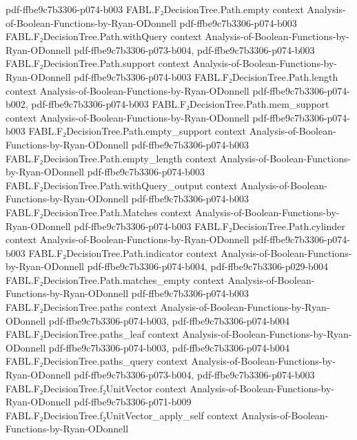 \begin{theorem}
  {pdf-ffbe9c7b3306-p074-b003}
\proofstep
  {FABL.F₂DecisionTree.Path.empty}
  {context}
  {Analysis-of-Boolean-Functions-by-Ryan-ODonnell}
  {pdf-ffbe9c7b3306-p074-b003}
\proofstep
  {FABL.F₂DecisionTree.Path.withQuery}
  {context}
  {Analysis-of-Boolean-Functions-by-Ryan-ODonnell}
  {pdf-ffbe9c7b3306-p073-b004,
    pdf-ffbe9c7b3306-p074-b003}
\proofstep
  {FABL.F₂DecisionTree.Path.support}
  {context}
  {Analysis-of-Boolean-Functions-by-Ryan-ODonnell}
  {pdf-ffbe9c7b3306-p074-b003}
\proofstep
  {FABL.F₂DecisionTree.Path.length}
  {context}
  {Analysis-of-Boolean-Functions-by-Ryan-ODonnell}
  {pdf-ffbe9c7b3306-p074-b002,
    pdf-ffbe9c7b3306-p074-b003}
\proofstep
  {FABL.F₂DecisionTree.Path.mem_support}
  {context}
  {Analysis-of-Boolean-Functions-by-Ryan-ODonnell}
  {pdf-ffbe9c7b3306-p074-b003}
\proofstep
  {FABL.F₂DecisionTree.Path.empty_support}
  {context}
  {Analysis-of-Boolean-Functions-by-Ryan-ODonnell}
  {pdf-ffbe9c7b3306-p074-b003}
\proofstep
  {FABL.F₂DecisionTree.Path.empty_length}
  {context}
  {Analysis-of-Boolean-Functions-by-Ryan-ODonnell}
  {pdf-ffbe9c7b3306-p074-b003}
\proofstep
  {FABL.F₂DecisionTree.Path.withQuery_output}
  {context}
  {Analysis-of-Boolean-Functions-by-Ryan-ODonnell}
  {pdf-ffbe9c7b3306-p074-b003}
\proofstep
  {FABL.F₂DecisionTree.Path.Matches}
  {context}
  {Analysis-of-Boolean-Functions-by-Ryan-ODonnell}
  {pdf-ffbe9c7b3306-p074-b003}
\proofstep
  {FABL.F₂DecisionTree.Path.cylinder}
  {context}
  {Analysis-of-Boolean-Functions-by-Ryan-ODonnell}
  {pdf-ffbe9c7b3306-p074-b003}
\proofstep
  {FABL.F₂DecisionTree.Path.indicator}
  {context}
  {Analysis-of-Boolean-Functions-by-Ryan-ODonnell}
  {pdf-ffbe9c7b3306-p074-b004,
    pdf-ffbe9c7b3306-p029-b004}
\proofstep
  {FABL.F₂DecisionTree.Path.matches_empty}
  {context}
  {Analysis-of-Boolean-Functions-by-Ryan-ODonnell}
  {pdf-ffbe9c7b3306-p074-b003}
\proofstep
  {FABL.F₂DecisionTree.paths}
  {context}
  {Analysis-of-Boolean-Functions-by-Ryan-ODonnell}
  {pdf-ffbe9c7b3306-p074-b003,
    pdf-ffbe9c7b3306-p074-b004}
\proofstep
  {FABL.F₂DecisionTree.paths_leaf}
  {context}
  {Analysis-of-Boolean-Functions-by-Ryan-ODonnell}
  {pdf-ffbe9c7b3306-p074-b003,
    pdf-ffbe9c7b3306-p074-b004}
\proofstep
  {FABL.F₂DecisionTree.paths_query}
  {context}
  {Analysis-of-Boolean-Functions-by-Ryan-ODonnell}
  {pdf-ffbe9c7b3306-p073-b004,
    pdf-ffbe9c7b3306-p074-b003}
\proofstep
  {FABL.F₂DecisionTree.f₂UnitVector}
  {context}
  {Analysis-of-Boolean-Functions-by-Ryan-ODonnell}
  {pdf-ffbe9c7b3306-p071-b009}
\proofstep
  {FABL.F₂DecisionTree.f₂UnitVector_apply_self}
  {context}
  {Analysis-of-Boolean-Functions-by-Ryan-ODonnell}

\end{theorem}
